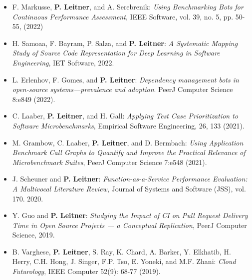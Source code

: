 \documentclass[paper=letter,fontsize=11pt]{scrartcl} %
\begin{document}
\begin{itemize}
  \item F. Markusse, \textbf{P. Leitner}, and A. Serebrenik: \emph{Using Benchmarking Bots for Continuous Performance Assessment}, IEEE Software, vol. 39, no. 5, pp. 50-55, (2022)
  \item H. Samoaa, F. Bayram, P. Salza, and \textbf{P. Leitner}: \emph{A Systematic Mapping Study of Source Code Representation for Deep Learning in Software Engineering}, IET Software, 2022. \\ 
  \item L. Erlenhov,  F. Gomes, and \textbf{P. Leitner}: \emph{Dependency management bots in open-source systems—prevalence and adoption}. PeerJ Computer Science 8:e849 (2022). 
  \item C. Laaber, \textbf{P. Leitner}, and H. Gall: \emph{Applying Test Case Prioritization to Software Microbenchmarks}, Empirical Software Engineering, 26, 133 (2021). 
  \item M. Grambow, C. Laaber, \textbf{P. Leitner}, and D. Bermbach: \emph{Using Application Benchmark Call Graphs
  to Quantify and Improve the Practical
  Relevance of Microbenchmark Suites}, PeerJ Computer Science 7:e548 (2021). 
	\item  J. Scheuner and \textbf{P. Leitner}: \emph{Function-as-a-Service Performance Evaluation: A Multivocal
 Literature Review}, Journal of Systems and Software (JSS), vol. 170. 2020. 
	\item  Y. Guo and \textbf{P. Leitner}: \emph{Studying the Impact of CI on Pull Request Delivery Time in Open Source Projects — a Conceptual Replication}, PeerJ Computer Science, 2019. 
	\item  B. Varghese, \textbf{P. Leitner}, S. Ray, K. Chard, A. Barker, Y. Elkhatib, H. Herry, C.H. Hong, J. Singer, F.P. Tso, E. Yoneki, and M.F. Zhani: \emph{Cloud Futurology}, IEEE Computer 52(9): 68-77 (2019). 
\end{itemize}
\end{document}
